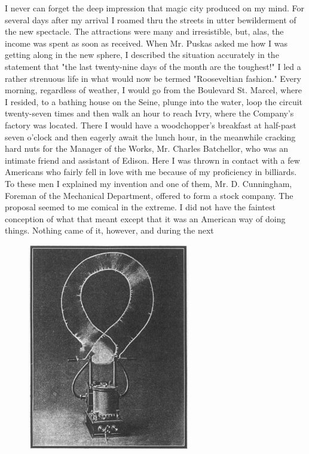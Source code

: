 \documentclass[a4paper,12pt,english,twoside,openright]{memoir}
\begin{document}
I never can forget the deep impression that magic city produced on my mind.  For several days 
after my arrival I roamed thru the streets in utter bewilderment of the new spectacle.  The 
attractions were many and irresistible, but, alas, the income was spent as soon as received.  
When Mr. Puskas asked me how I was getting along in the new sphere, I described the situation 
accurately in the statement that "the last twenty-nine days of the month are the toughest!" I led a 
rather strenuous life in what would now be termed "Rooseveltian fashion." Every morning, 
regardless of weather, I would go from the Boulevard St.  Marcel, where I resided, to a bathing 
house on the Seine, plunge into the water, loop the circuit twenty-seven times and then walk an 
hour to reach Ivry, where the Company's factory was located.  There I would have a 
woodchopper's breakfast at half-past seven o'clock and then eagerly await the lunch hour, in the 
meanwhile cracking hard nuts for the Manager of the Works, Mr. Charles Batchellor, who was an 
intimate friend and assistant of Edison.  Here I was thrown in contact with a few Americans who 
fairly fell in love with me because of my proficiency in billiards.  To these men I explained my 
invention and one of them, Mr. D. Cunningham, Foreman of the Mechanical Department, offered 
to form a stock company.  The proposal seemed to me comical in the extreme.  I did not have the 
faintest conception of what that meant except that it was an American way of doing things.  
Nothing came of it, however, and during the next
\begin{figure}
	\vspace{-20pt}
	\begin{center}
		\includegraphics[width=0.63\textwidth]{OscillationTransformer.png}
	\end{center}
	\vspace{-20pt}
\end{figure}
\end{document}
